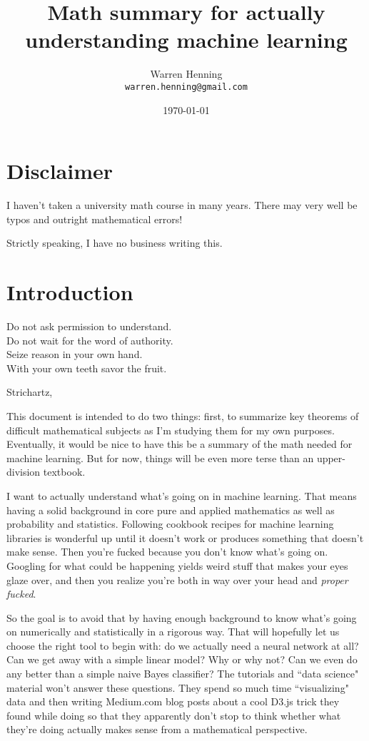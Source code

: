 \documentclass{article}
\theoremstyle{definition}
\begin{document}
\title{Math summary for actually understanding machine learning}
\author{Warren Henning\\\texttt{warren.henning@gmail.com}}
\date{\today}

\maketitle

\tableofcontents

\pagebreak

\section{Disclaimer}

I haven't taken a university math course in many years. There may very well
be typos and outright mathematical errors!

Strictly speaking, I have no business writing this.

\section{Introduction}

\epigraph{Do not ask permission to understand. \\ Do not wait for the word of authority. \\ Seize reason in your own hand. \\ With your own teeth savor the fruit.}{Strichartz, \cite{strichartz}}

This document is intended to do two things: first, to summarize key theorems of difficult mathematical subjects as I'm studying them for my own purposes. Eventually, it would be nice to have this be a summary of the math needed for machine learning. But for now, things will be even more terse than an upper-division textbook.

I want to actually understand what's going on in machine learning. That means having a solid background in core pure and applied mathematics as well as probability and statistics. Following cookbook recipes for machine learning libraries is wonderful up until it doesn't work or produces something that doesn't make sense. Then you're fucked because you don't know what's going on. Googling for what could be happening yields weird stuff that makes your eyes glaze over, and then you realize you're both in way over your head and \emph{proper fucked}.

So the goal is to avoid that by having enough background to know what's going on numerically and statistically in a rigorous way. That will hopefully let us choose the right tool to begin with: do we actually need a neural network at all? Can we get away with a simple linear model? Why or why not? Can we even do any better than a simple naive Bayes classifier? The tutorials and ``data science" material won't answer these questions. They spend so much time ``visualizing" data and then writing Medium.com blog posts about a cool D3.js trick they found while doing so that they apparently don't stop to think whether what they're doing actually makes sense from a mathematical perspective.
\end{document}
